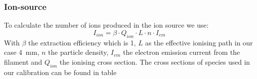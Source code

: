 		\subsubsection{Ion-source}
		To calculate the number of ions produced in the ion source we use:
		\begin{equation}
		I_{ion} = \beta\cdot Q_{ion}\cdot L\cdot n\cdot I_{em}
		\end{equation}
		With $\beta$ the extraction efficiency which is 1, %
		$L$ as the effective ionising path in our case 4~\si{\milli\metre}, $n$ the particle density, $I_{em}$ the electron emission current from the filament and $Q_{ion}$ the ionising cross section. The cross sections of species used in our calibration can be found in table %
		
		
		
	
	

		